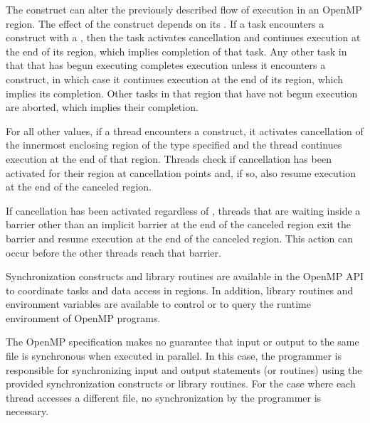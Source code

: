 
The  construct can alter the previously described flow of execution in an
OpenMP region. The effect of the  construct depends on its
. If a task encounters a 
construct with a 
, then the task activates cancellation
and continues execution at the end of its
 region, which implies completion of that task.
Any other task in that 
that has begun executing completes execution unless it encounters a 
 construct, in which case it continues execution at the end of its  region,
which implies its completion. Other tasks in that  region that have not
begun execution are aborted, which implies their completion.

For all other  values, if a
thread encounters a  construct, it
activates cancellation of the innermost enclosing region of the type specified and the
thread continues execution at the end of that region. Threads check if cancellation has
been activated for their region at cancellation points and, if so, also resume execution at
the end of the canceled region.

If cancellation has been activated regardless of ,
threads that are
waiting inside a barrier other than an implicit barrier at the end of the canceled region
exit the barrier and resume execution at the end of the canceled region. This action can
occur before the other threads reach that barrier.

Synchronization constructs and library routines are available in the OpenMP API to
coordinate tasks and data access in  regions. In addition, library routines and
environment variables are available to control or to query the runtime environment of
OpenMP programs.

The OpenMP specification makes no guarantee that input or output to the same file is
synchronous when executed in parallel. In this case, the programmer is responsible for
synchronizing input and output statements (or routines) using the provided
synchronization constructs or library routines. For the case where each thread accesses a
different file, no synchronization by the programmer is necessary.
